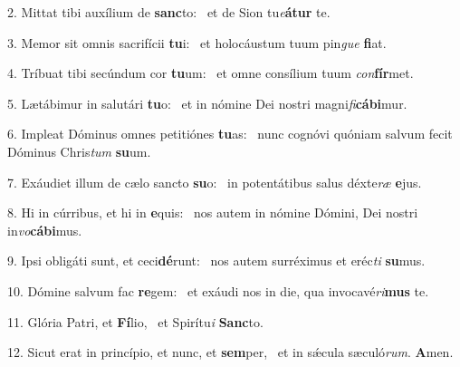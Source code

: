 2. Mittat tibi auxílium de \textbf{sanc}to: \ast\  et de Sion tu\textit{e}\textbf{á}\textbf{tur} te.\

3. Memor sit omnis sacrifícii \textbf{tu}i: \ast\  et holocáustum tuum pin\textit{gue} \textbf{fi}at.\

4. Tríbuat tibi secúndum cor \textbf{tu}um: \ast\  et omne consílium tuum \textit{con}\textbf{fír}met.\

5. Lætábimur in salutári \textbf{tu}o: \ast\  et in nómine Dei nostri magni\textit{fi}\textbf{cá}\textbf{bi}mur.\

6. Impleat Dóminus omnes petitiónes \textbf{tu}as: \ast\  nunc cognóvi quóniam salvum fecit Dóminus Chris\textit{tum} \textbf{su}um.\

7. Exáudiet illum de cælo sancto \textbf{su}o: \ast\  in potentátibus salus déxte\textit{ræ} \textbf{e}jus.\

8. Hi in cúrribus, et hi in \textbf{e}quis: \ast\  nos autem in nómine Dómini, Dei nostri in\textit{vo}\textbf{cá}\textbf{bi}mus.\

9. Ipsi obligáti sunt, et ceci\textbf{dé}runt: \ast\  nos autem surréximus et eréc\textit{ti} \textbf{su}mus.\

10. Dómine salvum fac \textbf{re}gem: \ast\  et exáudi nos in die, qua invocavé\textit{ri}\textbf{mus} te.\

11. Glória Patri, et \textbf{Fí}lio, \ast\  et Spirítu\textit{i} \textbf{Sanc}to.\

12. Sicut erat in princípio, et nunc, et \textbf{sem}per, \ast\  et in sǽcula sæculó\textit{rum}. \textbf{A}men.\

